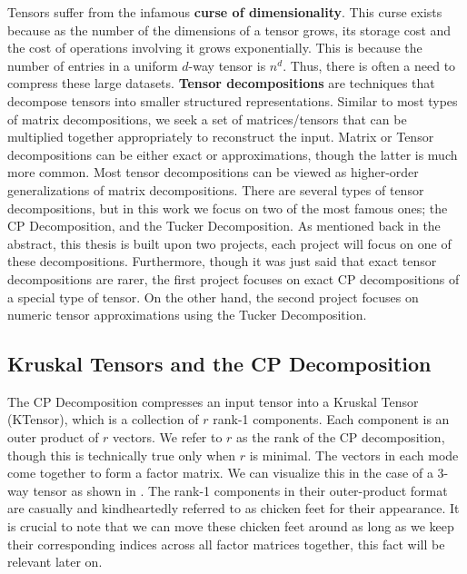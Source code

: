 
Tensors suffer from the infamous \textbf{curse of dimensionality}. This curse
exists because as the number of the dimensions of a tensor grows, its storage
cost and the cost of operations involving it grows exponentially. This is
because the number of entries in a uniform $d$-way tensor is $n^d$. Thus, there
is often a need to compress these large datasets. \textbf{Tensor decompositions}
are techniques that decompose tensors into smaller structured representations.
Similar to most types of matrix decompositions, we seek a set of
matrices/tensors that can be multiplied together appropriately to reconstruct
the input. Matrix or Tensor decompositions can be either exact or
approximations, though the latter is much more common. Most tensor
decompositions can be viewed as higher-order generalizations of matrix
decompositions. There are several types of tensor decompositions, but in this
work we focus on two of the most famous ones; the CP Decomposition, and the
Tucker Decomposition. As mentioned back in the abstract, this thesis is built
upon two projects, each project will focus on one of these decompositions.
Furthermore, though it was just said that exact tensor decompositions are rarer,
the first project focuses on exact CP decompositions of a special type of
tensor. On the other hand, the second project focuses on numeric tensor
approximations using the Tucker Decomposition. 


\subsection{Kruskal Tensors and the CP Decomposition} \label{sec:Kruskal Tensors
    and The CP Decomposition} The CP Decomposition compresses an input tensor
    into a Kruskal Tensor (KTensor), which is a collection of $r$ rank-1
    components. Each component is an outer product of $r$ vectors. We refer to
    $r$ as the rank of the CP decomposition, though this is technically true
    only when $r$ is minimal. The vectors in each mode come together to form a
    factor matrix. We can visualize this in the case of a 3-way tensor as shown
    in . The rank-1 components in their outer-product format
    are casually and kindheartedly referred to as chicken feet for their
    appearance. It is crucial to note that we can move these chicken feet around
    as long as we keep their corresponding indices across all factor matrices
    together, this fact will be relevant later on.

